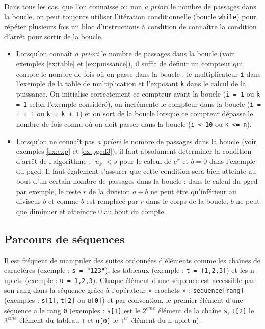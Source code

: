 Dans tous les cas, que l'on connaisse ou non {\em a priori} le nombre de passages dans la boucle, on peut
toujours utiliser l'itération conditionnelle (boucle {\tt while}) pour répéter plusieurs fois un bloc
d'instructions à condition de connaître la condition d'arrêt pour sortir de la boucle.
\begin{itemize}
\item Lorsqu'on connaît {\em a priori} le nombre de passages dans la boucle (voir exemples
	\ref{ex:table} et \ref{ex:puissance}), il suffit de définir un compteur qui compte le nombre
	de fois où on passe dans la boucle : le multiplicateur {\tt i} dans l'exemple de la table
	de multiplication et l'exposant {\tt k} dans le calcul de la puissance.
	On initialise correctement ce compteur avant la boucle ({\tt i = 1} ou {\tt k = 1} selon
	l'exemple considéré), on incrémente le compteur dans la boucle ({\tt i = i + 1} ou {\tt k = k + 1})
	et on sort de la boucle lorsque ce compteur dépasse le nombre de fois connu
	où on doit passer dans la boucle ({\tt i < 10} ou {\tt k <= n}).
\item Lorsqu'on ne connaît pas {\em a priori} le nombre de passages dans la boucle (voir exemples
	\ref{ex:exp} et \ref{ex:pgcd3}), il faut absolument déterminer la condition d'arrêt
	de l'algorithme : $|u_k| < s$ pour le calcul de $e^x$ et $b = 0$ dans l'exemple du pgcd.
	Il faut également s'assurer que cette condition sera bien atteinte au bout d'un certain 
	nombre de passages dans la boucle : dans le calcul du pgcd par exemple, le reste $r$ de la division 
	$a \div b$ ne peut être qu'inférieur au diviseur $b$ et comme $b$ est remplacé par $r$ dans le corps
	de la boucle, $b$ ne peut que diminuer et atteindre $0$ au bout du compte.
\end{itemize}


\subsection{Parcours de séquences}\label{sub:parcours}
Il est fréquent de manipuler des suites ordonnées d'éléments comme 
les chaînes de caractères (exemple : {\tt s = "123"}), les tableaux
(exemple : {\tt t = [1,2,3]}) et les n-uplets (exemple : {\tt u = 1,2,3}).
Chaque élément d'une séquence est accessible par son rang dans la séquence 
grâce à l'opérateur « crochets » : {\tt sequence[rang]} (exemples : {\tt s[1]}, {\tt t[2]} ou {\tt u[0]}) et par convention, 
le premier élément d'une séquence a le rang {\tt 0} (exemples : {\tt s[1]} est le $2^{\grave eme}$
élément de la chaîne {\tt s}, {\tt t[2]} le $3^{\grave eme}$ élément du tableau {\tt t}
et {\tt u[0]} le $1^{er}$ élément du n-uplet {\tt u}).


